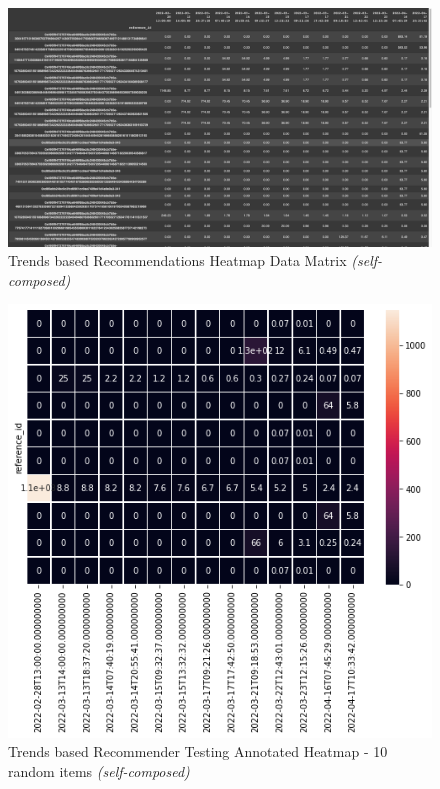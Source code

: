 \documentclass[manuscript,natbib=false]{acmart}
\begin{document}
\begin{figure}[h]
\centering
\includegraphics[width=\linewidth]{images/heatmap-data.png}
\caption{Trends based Recommendations Heatmap Data Matrix \textit{(self-composed)}}
\label{fig:trends-recsys-heatmap-data-matrix}
\end{figure}


\begin{figure}[h]
\centering
\includegraphics[width=0.6\linewidth]{images/trends-heatmap-10-rand-annot.png}
\caption{Trends based Recommender Testing Annotated Heatmap - 10 random items \textit{(self-composed)}}
\label{fig:trends-recsys-heatmap-10-anot}
\end{figure}
\end{document}

